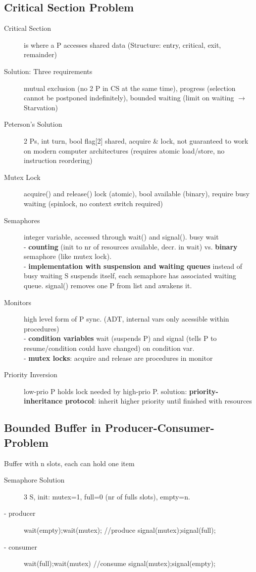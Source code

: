 \subsection*{Critical Section Problem}
\begin{description}
    \item[Critical Section]is where a P accesses shared data (Structure: entry, critical, exit, remainder)
    \item[Solution: Three requirements] mutual exclusion (no 2 P in CS at the same time), progress (selection cannot be postponed indefinitely), bounded waiting (limit on waiting $\rightarrow$ Starvation)
    \item[Peterson's Solution]2 Ps, int turn, bool flag[2] shared, acquire \& lock, not guaranteed to work on modern computer architectures (requires atomic load/store, no instruction reordering)
    \item[Mutex Lock] acquire() and release() lock (atomic), bool available (binary), require busy waiting (spinlock, no context switch required)
    \item[Semaphores] integer variable, accessed through wait() and signal(). busy wait \\
        - \textbf{counting} (init to nr of resources available, decr. in wait) vs. \textbf{binary} semaphore (like mutex lock). \\
        -  \textbf{implementation with suspension and waiting queues} instead of busy waiting S suspends itself, each semaphore has associated waiting queue. signal() removes one P from list and awakens it.   %
    \item[Monitors] high level form of P sync. (ADT, internal vars only acessible within procedures) \\
        - \textbf{condition variables} wait (suspends P) and signal (tells P to resume/condition could have changed) on condition var. \\
        - \textbf{mutex locks}: acquire and release are procedures in monitor
    \item[Priority Inversion] low-prio P holds lock needed by high-prio P. solution: \textbf{priority-inheritance protocol}: inherit higher priority until finished with resources
\end{description}

\subsection*{Bounded Buffer in Producer-Consumer-Problem}
Buffer with n slots, each can hold one item
\begin{description}
    \item[Semaphore Solution]3 S, init: mutex=1, full=0 (nr of fulls slots), empty=n.
    \item[- producer]wait(empty);wait(mutex); //produce signal(mutex);signal(full);
    \item[- consumer]wait(full);wait(mutex) //consume signal(mutex);signal(empty);
\end{description}

